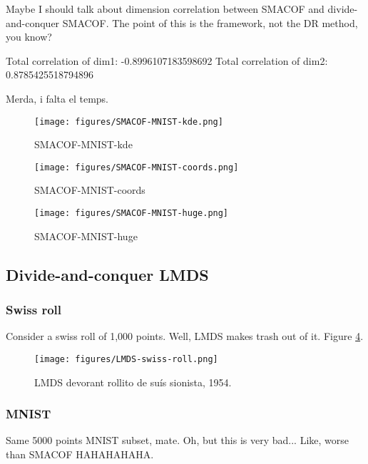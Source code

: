Maybe I should talk about dimension correlation between SMACOF and divide-and-conquer SMACOF. The point of this is the framework, not the DR method, you know?

Total correlation of dim1: -0.8996107183598692
Total correlation of dim2: 0.8785425518794896

Merda, i falta el temps.

\begin{figure}[ht]
    \centering
    \texttt{[image: figures/SMACOF-MNIST-kde.png]}
    \caption{SMACOF-MNIST-kde}
    \label{fig:SMACOF-MNIST-kde}
\end{figure}

\begin{figure}[ht]
    \centering
    \texttt{[image: figures/SMACOF-MNIST-coords.png]}
    \caption{SMACOF-MNIST-coords}
    \label{fig:SMACOF-MNIST-coords}
\end{figure}

\begin{figure}[ht]
    \centering
    \texttt{[image: figures/SMACOF-MNIST-huge.png]}
    \caption{SMACOF-MNIST-huge}
    \label{fig:SMACOF-MNIST-huge}
\end{figure}

\subsection{Divide-and-conquer LMDS}

\subsubsection{Swiss roll}

Consider a swiss roll of 1,000 points. Well, LMDS makes trash out of it. Figure \ref{fig:LMDS-swiss-roll}.

\begin{figure}[ht]
    \centering
    \texttt{[image: figures/LMDS-swiss-roll.png]}
    \caption{LMDS devorant rollito de suís sionista, 1954.}
    \label{fig:LMDS-swiss-roll}
\end{figure}

\subsubsection{MNIST}

Same 5000 points MNIST subset, mate. Oh, but this is very bad... Like, worse than SMACOF HAHAHAHAHA.

